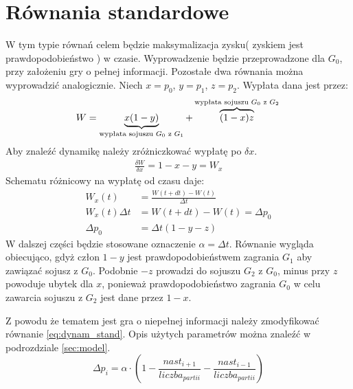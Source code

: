 \section{Równania standardowe}
\label{sec:r_stand}
W tym typie równań celem będzie maksymalizacja zysku( zyskiem jest prawdopodobieństwo ) w czasie. Wyprowadzenie będzie przeprowadzone dla $G_0$, przy założeniu gry o pełnej informacji. Pozostałe dwa równania można wyprowadzić analogicznie. Niech $x=p_0$, $y=p_1$, $z=p_2$. Wypłata dana jest przez:
\begin{equation}\label{eq:wypl_stand}
W = \underbrace{x(1-y)}_{\text{wypłata sojuszu $G_0$ z $G_1$}} + \overbrace{(1-x)z}^{\text{wypłata sojuszu $G_0$ z $G_2$}} \\
\end{equation}
Aby znaleźć dynamikę należy zróżniczkować wypłatę po $\delta x$.
\begin{align*}
\frac{\delta W}{\delta x} = 1-x-y = W_x
\end{align*}
Schematu różnicowy na wypłatę od czasu daje:
\begin{align}\label{eq:dynam_stand}
W_x(t) &= \frac{W(t+dt)-W(t)}{\Delta t} \nonumber\\
W_x(t) \Delta t &= W(t+dt)-W(t) = \Delta p_0 \nonumber\\
\Delta p_0 &= \Delta t (1-y-z)
\end{align}
W dalszej części będzie stosowane oznaczenie $\alpha = \Delta t$. Równanie wygląda obiecująco, gdyż człon $1 - y$ jest prawdopodobieństwem zagrania $G_1$ aby zawiązać sojusz z $G_0$. Podobnie $-z$ prowadzi do sojuszu $G_2$ z $G_0$, minus przy $z$ powoduje ubytek dla $x$, ponieważ prawdopodobieństwo zagrania $G_0$ w celu zawarcia sojuszu z $G_2$ jest dane przez $1-x$.

Z powodu że tematem jest gra o niepełnej informacji należy zmodyfikować równanie \ref{eq:dynam_stand}. Opis użytych parametrów można znaleźć w podrozdziale \ref{sec:model}.
\begin{equation} \label{eq:stand}
\Delta p_i = \alpha \cdot (1 - \frac{nast_{i+1}}{liczba_{partii}} - \frac{nast_{i-1}}{liczba_{partii}})
\end{equation}



